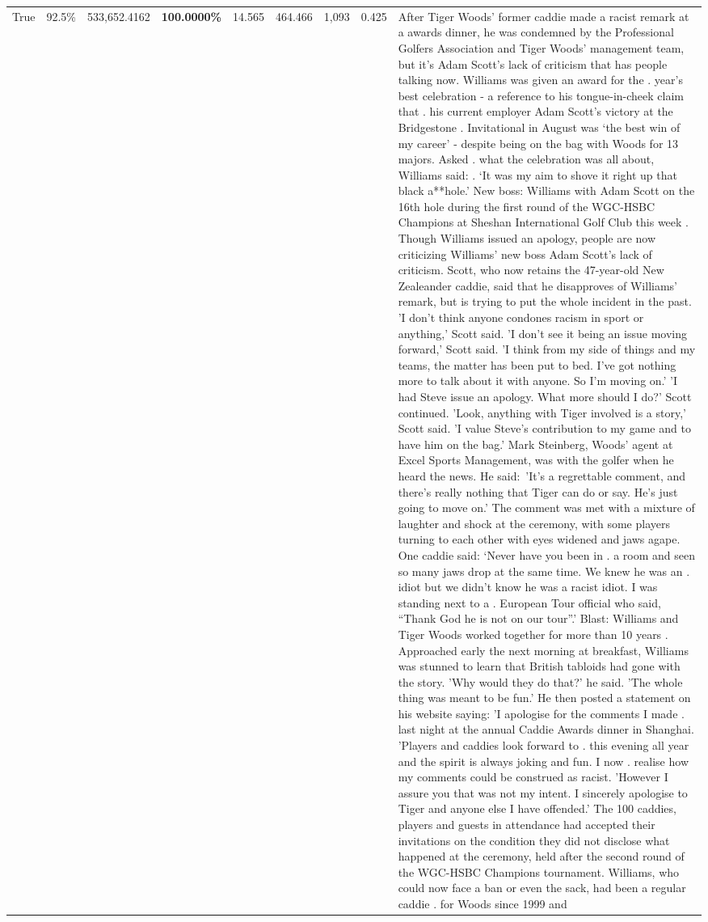 \begin{table}[H]
\begin{tabular}{lllrlllll}
True & 92.5\% & 533,652.4162 & \bfseries \color{red} 100.0000\% & 14.565 & 464.466 & 1,093 & 0.425 & After Tiger Woods' former caddie made a racist remark at a awards dinner, he was condemned by the Professional Golfers Association and Tiger Woods' management team, but it's Adam Scott's lack of criticism that has people talking now. Williams was given an award for the . year’s best celebration - a reference to his tongue-in-cheek claim that . his current employer Adam Scott’s victory at the Bridgestone . Invitational in August was ‘the best win of my career’ - despite being on the bag with Woods for 13 majors. Asked . what the celebration was all about, Williams said: . ‘It was my aim to shove it right up that black a**hole.’ New boss: Williams with Adam Scott  on the 16th hole during the first round of the WGC-HSBC Champions at Sheshan International Golf Club this week . Though Williams issued an apology, people are now criticizing Williams' new boss Adam Scott's lack of criticism. Scott, who now retains the 47-year-old New Zealeander caddie, said that he disapproves of Williams' remark, but is trying to put the whole incident in the past. 'I don't think anyone condones racism in sport or anything,' Scott said. 'I don't see it being an issue moving forward,' Scott said. 'I think from my side of things and my teams, the matter has been put to bed. I've got nothing more to talk about it with anyone. So I'm moving on.' 'I had Steve issue an apology. What more should I do?' Scott continued. 'Look, anything with Tiger involved is a story,' Scott said. 'I value Steve's contribution to my game and to have him on the bag.' Mark Steinberg, Woods' agent at Excel Sports Management, was with the golfer when he heard the news. He said: 'It's a regrettable comment, and there's really nothing that Tiger can do or say. He's just going to move on.' The comment was met with a mixture of laughter and shock at the ceremony, with some players turning to each other with eyes widened and jaws agape. One caddie said: ‘Never have you been in . a room and seen so many jaws drop at the same time. We knew he was an . idiot but we didn’t know he was a racist idiot. I was standing next to a . European Tour official who said, “Thank God he is not on our tour”.’ Blast: Williams and Tiger Woods worked together for more than 10 years . Approached early the next morning at breakfast, Williams was stunned to learn that British tabloids had gone with the story. 'Why would they do that?' he said. 'The whole thing was meant to be fun.' He then posted a statement on his website saying: 'I apologise for the comments I made . last night at the annual Caddie Awards dinner in Shanghai. 'Players and caddies look forward to . this evening all year and the spirit is always joking and fun. I now . realise how my comments could be construed as racist. 'However I assure you that was not my intent. I sincerely apologise to Tiger and anyone else I have offended.' The 100 caddies, players and guests in attendance had accepted their invitations on the condition they did not disclose what happened at the ceremony, held after the second round of the WGC-HSBC Champions tournament. Williams, who could now face a ban or even the sack, had been a regular caddie . for Woods since 1999 and 
\end{tabular}
\end{table}
